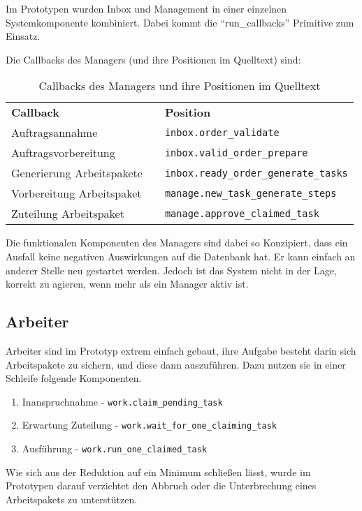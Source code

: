 Im Prototypen wurden Inbox und Management in einer einzelnen Systemkomponente  kombiniert.
Dabei kommt die ``run\_callbacks'' Primitive zum Einsatz.

Die Callbacks des Managers (und ihre Positionen im Quelltext) sind:
\begin{table}
\begin{tabular}{lcl}
    \textbf{Callback} && \textbf{Position} \\
    Auftragsannahme && \verb|inbox.order_validate| \\
    Auftragsvorbereitung && \verb|inbox.valid_order_prepare| \\
    Generierung Arbeitspakete && \verb|inbox.ready_order_generate_tasks| \\
    Vorbereitung Arbeitspaket && \verb|manage.new_task_generate_steps| \\
    Zuteilung Arbeitspaket && \verb|manage.approve_claimed_task| \\
\end{tabular}
\caption{Callbacks des Managers und ihre Positionen im Quelltext}
\label{tab:callbacks-manager}
\end{table}

Die funktionalen Komponenten des Managers sind dabei so Konzipiert,
dass ein Ausfall keine negativen Auswirkungen auf die Datenbank hat.
Er kann einfach an anderer Stelle neu gestartet werden.
Jedoch ist das System nicht in der Lage, korrekt zu agieren, wenn mehr als ein Manager aktiv ist.
\subsection{Arbeiter}

Arbeiter sind im Prototyp extrem einfach gebaut,
ihre Aufgabe besteht darin sich Arbeitspakete zu sichern,
und diese dann auszuführen.
Dazu nutzen sie in einer Schleife folgende Komponenten.

\begin{enumerate}
    \item Inanspruchnahme - \verb|work.claim_pending_task|
    \item Erwartung Zuteilung - \verb|work.wait_for_one_claiming_task|
    \item Ausführung - \verb|work.run_one_claimed_task|
\end{enumerate}

Wie sich aus der Reduktion auf ein Minimum schließen lässt,
wurde im Prototypen darauf verzichtet den Abbruch oder die Unterbrechung
eines Arbeitspakets zu unterstützen.

